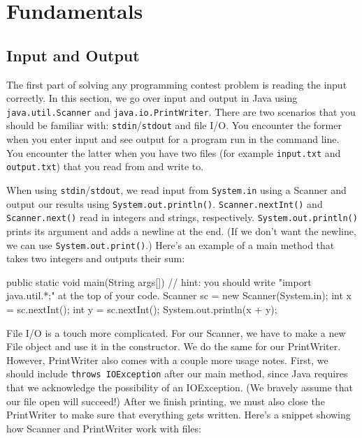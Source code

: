 \chapter{Fundamentals}

\section{Input and Output}

The first part of solving any programming contest problem is reading the input correctly. In this section, we go over input and output in Java using \texttt{java.util.Scanner} and \texttt{java.io.PrintWriter}. There are two scenarios that you should be familiar with: \texttt{stdin}/\texttt{stdout} and file I/O. You encounter the former when you enter input and see output for a program run in the command line. You encounter the latter when you have two files (for example \texttt{input.txt} and \texttt{output.txt}) that you read from and write to.

When using \texttt{stdin}/\texttt{stdout}, we read input from \texttt{System.in} using a Scanner and output our results using \texttt{System.out.println()}. \texttt{Scanner.nextInt()} and \texttt{Scanner.next()} read in integers and strings, respectively. \texttt{System.out.println()} prints its argument and adds a newline at the end. (If we don't want the newline, we can use \texttt{System.out.print()}.) Here's an example of a main method that takes two integers and outputs their sum:

\begin{mylstlisting}
public static void main(String args[]) {
  // hint: you should write "import java.util.*;" at the top of your code.
  Scanner sc = new Scanner(System.in);
  int x = sc.nextInt();
  int y = sc.nextInt();
  System.out.println(x + y);
}
\end{mylstlisting}

File I/O is a touch more complicated. For our Scanner, we have to make a new File object and use it in the constructor. We do the same for our PrintWriter. However, PrintWriter also comes with a couple more usage notes. First, we should include \texttt{throws IOException} after our main method, since Java requires that we acknowledge the possibility of an IOException. (We bravely assume that our file open will succeed!) After we finish printing, we must also close the PrintWriter to make sure that everything gets written. Here's a snippet showing how Scanner and PrintWriter work with files: 

